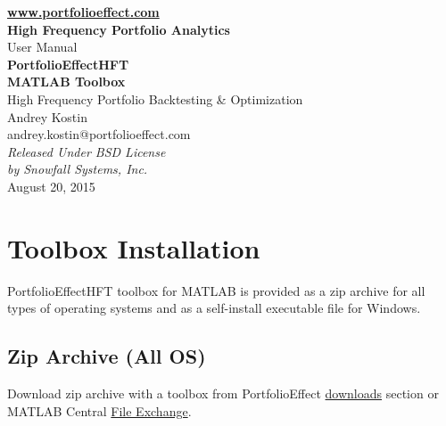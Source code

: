 \documentclass[letterpaper]{report}
\begin{document}
\begin{titlepage}
\begin{center}
\vspace{5cm}
{\bfseries\href{https://www.portfolioeffect.com}{www.portfolioeffect.com} \\
High Frequency Portfolio Analytics\\}
\vspace{8cm}
{\huge User Manual \\}
\vspace{0.3cm}
{\Huge\bfseries PortfolioEffectHFT \\ MATLAB Toolbox \\}
\vspace{0.4cm}
{\Large High Frequency Portfolio Backtesting \& Optimization \\}
\vspace{1.5cm}
{Andrey Kostin \\ andrey.kostin@portfolioeffect.com} \\[14pt]
\vfill
\emph{{Released Under BSD License\\ by Snowfall Systems,
Inc.}}\\[2cm]
{August 20, 2015}
\end{center}
\end{titlepage}

\cleardoublepage
{}
{}
\renewcommand{\bibname}{Contents}
\tableofcontents 

\chapter{Toolbox Installation}
PortfolioEffectHFT toolbox for MATLAB is provided as a zip archive for all
types of operating systems and as a self-install executable file for Windows. 

\section{Zip Archive (All OS)}
Download zip archive with a toolbox from PortfolioEffect  
\href{https://www.portfolioeffect.com/docs/platform/quant/tools/matlab}{downloads}
section or MATLAB Central 
\href{http://www.mathworks.com/matlabcentral/fileexchange/53194-portfolioeffecthft-high-frequency-trading-toolbox}{File Exchange}.
\end{document}
